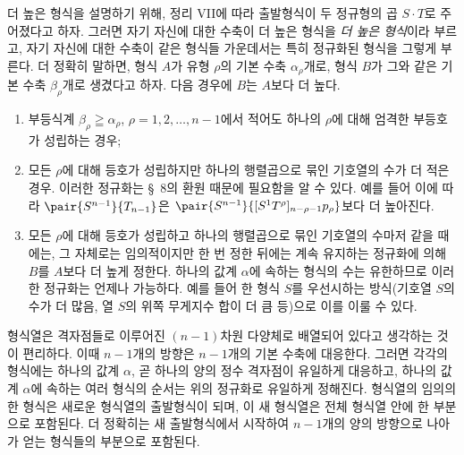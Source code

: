 
더 높은 형식을 설명하기 위해, 정리 VII에 따라 출발형식이 두 정규형의 곱 $S\cdot T$로 주어졌다고 하자. 그러면 자기 자신에 대한 수축이 더 높은 형식을 \emph{더 높은 형식}이라 부르고, 자기 자신에 대한 수축이 같은 형식들 가운데서는 특히 정규화된 형식을 그렇게 부른다. 더 정확히 말하면, 형식 $A$가 유형 $\rho$의 기본 수축 $\alpha_\rho$개로, 형식 $B$가 그와 같은 기본 수축 $\beta_\rho$개로 생겼다고 하자. 다음 경우에 $B$는 $A$보다 더 높다.
\begin{enumerate}
\renewcommand{\labelenumi}{\arabic{enumi})}
\item 부등식계 $\beta_\rho\geqq\alpha_\rho$, $\rho=1,2,\ldots,n-1$에서 적어도 하나의 $\rho$에 대해 엄격한 부등호가 성립하는 경우;
\item 모든 $\rho$에 대해 등호가 성립하지만 하나의 행렬곱으로 묶인 기호열의 수가 더 적은 경우. 이러한 정규화는 \S\ 8의 환원 때문에 필요함을 알 수 있다. 예를 들어 이에 따라 $\pair{S^{n-1}}{T_{n-1}}$은 $\pair{S^{n-1}}{[S^1T^\rho]_{n-\rho-1}p_\rho}$보다 더 높아진다.
\item 모든 $\rho$에 대해 등호가 성립하고 하나의 행렬곱으로 묶인 기호열의 수마저 같을 때에는, 그 자체로는 임의적이지만 한 번 정한 뒤에는 계속 유지하는 정규화에 의해 $B$를 $A$보다 더 높게 정한다. 하나의 값계 $\alpha$에 속하는 형식의 수는 유한하므로 이러한 정규화는 언제나 가능하다. 예를 들어 한 형식 $S$를 우선시하는 방식(기호열 $S$의 수가 더 많음, 열 $S$의 위쪽 무게지수 합이 더 큼 등)으로 이를 이룰 수 있다.
\end{enumerate}
형식열은 격자점들로 이루어진 $(n-1)$차원 다양체로 배열되어 있다고 생각하는 것이 편리하다. 이때 $n-1$개의 방향은 $n-1$개의 기본 수축에 대응한다. 그러면 각각의 형식에는 하나의 값계 $\alpha$, 곧 하나의 양의 정수 격자점이 유일하게 대응하고, 하나의 값계 $\alpha$에 속하는 여러 형식의 순서는 위의 정규화로 유일하게 정해진다. 형식열의 임의의 한 형식은 새로운 형식열의 출발형식이 되며, 이 새 형식열은 전체 형식열 안에 한 부분으로 포함된다. 더 정확히는 새 출발형식에서 시작하여 $n-1$개의 양의 방향으로 나아가 얻는 형식들의 부분으로 포함된다.

